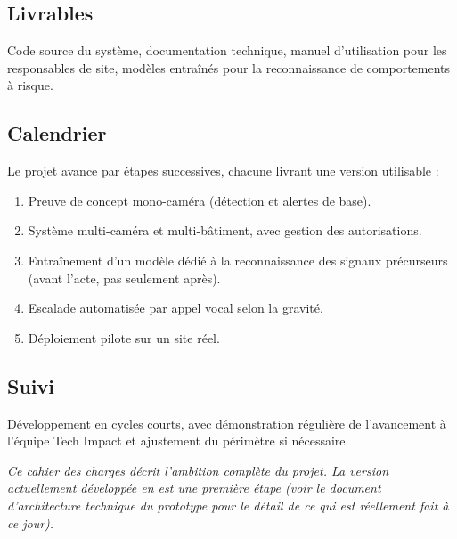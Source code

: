 \documentclass[11pt,a4paper]{article}
\begin{document}
\subsection{Livrables}
Code source du système, documentation technique, manuel d'utilisation pour les responsables de site, modèles entraînés pour la reconnaissance de comportements à risque.

\subsection{Calendrier}
Le projet avance par étapes successives, chacune livrant une version utilisable :
\begin{enumerate}[leftmargin=1.4em, itemsep=2pt]
  \item Preuve de concept mono-caméra (détection et alertes de base).
  \item Système multi-caméra et multi-bâtiment, avec gestion des autorisations.
  \item Entraînement d'un modèle dédié à la reconnaissance des signaux précurseurs (avant l'acte, pas seulement après).
  \item Escalade automatisée par appel vocal selon la gravité.
  \item Déploiement pilote sur un site réel.
\end{enumerate}

\subsection{Suivi}
Développement en cycles courts, avec démonstration régulière de l'avancement à l'équipe Tech Impact et ajustement du périmètre si nécessaire.

\vspace{1em}
\noindent\textit{Ce cahier des charges décrit l'ambition complète du projet. La version actuellement développée en est une première étape (voir le document d'architecture technique du prototype pour le détail de ce qui est réellement fait à ce jour).}
\end{document}
